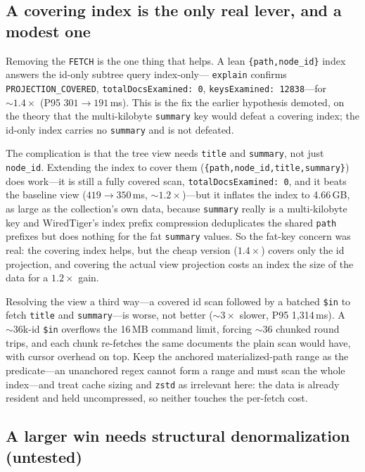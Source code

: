 \documentclass[11pt]{article}
\newcommand{\code}[1]{\texttt{#1}}
\begin{document}
\subsection{A covering index is the only real lever, and a modest one}

Removing the \code{FETCH} is the one thing that helps. A lean
\code{\{path,node\_id\}} index answers the id-only subtree query index-only---
\code{explain} confirms \code{PROJECTION\_COVERED}, \code{totalDocsExamined:\,0},
\code{keysExamined:\,12838}---for ${\sim}1.4\times$ (P95 $301\to191$\,ms). This is
the fix the earlier hypothesis demoted, on the theory that the multi-kilobyte
\code{summary} key would defeat a covering index; the id-only index carries no
\code{summary} and is not defeated.

The complication is that the tree view needs \code{title} and \code{summary}, not
just \code{node\_id}. Extending the index to cover them
(\code{\{path,node\_id,title,summary\}}) does work---it is still a fully covered
scan, \code{totalDocsExamined:\,0}, and it beats the baseline view
($419\to350$\,ms, ${\sim}1.2\times$)---but it inflates the index to 4.66\,GB, as
large as the collection's own data, because \code{summary} really is a
multi-kilobyte key and WiredTiger's index prefix compression deduplicates the
shared \code{path} prefixes but does nothing for the fat \code{summary} values. So
the fat-key concern was real: the covering index helps, but the cheap version
($1.4\times$) covers only the id projection, and covering the actual view
projection costs an index the size of the data for a $1.2\times$ gain.

Resolving the view a third way---a covered id scan followed by a batched
\code{\$in} to fetch \code{title} and \code{summary}---is worse, not better
(${\sim}3\times$ slower, P95 1{,}314\,ms). A ${\sim}36$k-id \code{\$in} overflows
the 16\,MB command limit, forcing ${\sim}36$ chunked round trips, and each chunk
re-fetches the same documents the plain scan would have, with cursor overhead on
top. Keep the anchored materialized-path range as the predicate---an unanchored
regex cannot form a range and must scan the whole index---and treat cache sizing
and \code{zstd} as irrelevant here: the data is already resident and held
uncompressed, so neither touches the per-fetch cost.

\subsection{A larger win needs structural denormalization (untested)}
\end{document}
